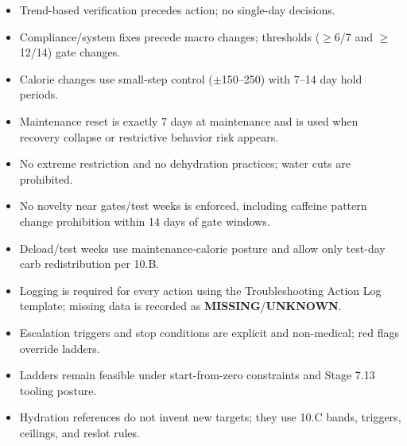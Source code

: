 \documentclass[10pt]{article}
\begin{document}
\begin{itemize}
\item Trend-based verification precedes action; no single-day decisions.
\item Compliance/system fixes precede macro changes; thresholds ($\geq$6/7 and $\geq$12/14) gate changes.
\item Calorie changes use small-step control ($\pm$150–250) with 7–14 day hold periods.
\item Maintenance reset is exactly 7 days at maintenance and is used when recovery collapse or restrictive behavior risk appears.
\item No extreme restriction and no dehydration practices; water cuts are prohibited.
\item No novelty near gates/test weeks is enforced, including caffeine pattern change prohibition within 14 days of gate windows.
\item Deload/test weeks use maintenance-calorie posture and allow only test-day carb redistribution per 10.B.
\item Logging is required for every action using the Troubleshooting Action Log template; missing data is recorded as \textbf{MISSING}/\textbf{UNKNOWN}.
\item Escalation triggers and stop conditions are explicit and non-medical; red flags override ladders.
\item Ladders remain feasible under start-from-zero constraints and Stage 7.13 tooling posture.
\item Hydration references do not invent new targets; they use 10.C bands, triggers, ceilings, and reslot rules.
\end{itemize}
\end{document}
